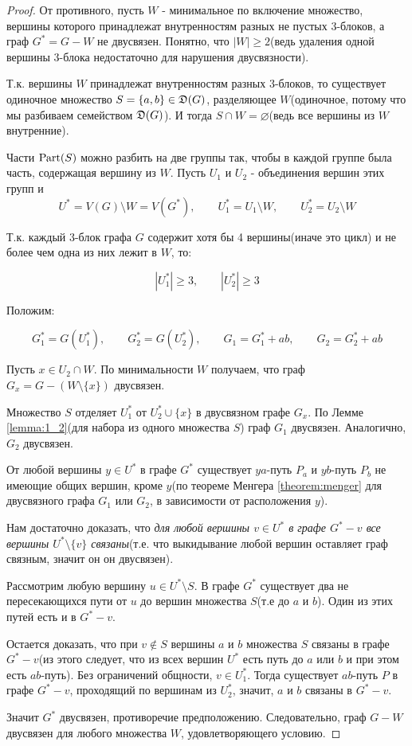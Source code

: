 \begin{proof}
	От противного, пусть $W$ - минимальное по включение множество, вершины которого принадлежат внутренностям разных не пустых 3-блоков, а граф  $G^* = G - W$ не двусвязен.
	Понятно, что  $|W| \geqslant 2$(ведь удаления одной вершины 3-блока недостаточно для нарушения двусвязности).

	Т.к. вершины  $W$ принадлежат внутренностям разных  $3$-блоков, то существует одиночное множество  $S = \{a, b\} \in \mathfrak{D}(G)$, разделяющее  $W$(одиночное, потому что мы разбиваем семейством $\mathfrak{D}(G)$).
	И тогда $S \cap W = \varnothing$(ведь все вершины из $W$ внутренние).
 
	Части $\operatorname{Part}(S)$ можно разбить на две группы так, чтобы в каждой группе была часть, содержащая вершину из  $W$.
	Пусть  $U_1$ и  $U_2$ - объединения вершин этих групп и 
	\[
		U^* = V(G) \setminus W = V(G^*), \qquad U_1^* = U_1 \setminus W, \qquad U^*_2 = U_2 \setminus W
	\]

	Т.к. каждый 3-блок графа $G$ содержит хотя бы 4 вершины(иначе это цикл) и не более чем одна из них лежит в  $W$, то:

	\[
		|U_1^*| \geqslant 3, \qquad |U_2^*| \geqslant 3
	\] 

	Положим:

	\[
		G_1^* = G(U_1^*), \qquad G_2^* = G(U_2^*), \qquad G_1 = G_1^* + ab, \qquad G_2 = G_2^* + ab
	\] 

	Пусть $x \in U_2 \cap W$.
	По минимальности $W$ получаем, что граф  $G_x = G - (W \setminus \{x\})$ двусвязен.

	Множество $S$ отделяет  $U_1^*$ от  $U_2^* \cup \{x \}$ в двусвязном графе $G_x$.
	По Лемме \ref{lemma:1_2}(для набора из одного множества $S$) граф $G_1$ двусвязен.
	Аналогично,  $G_2$ двусвязен.

	От любой вершины  $y \in U^*$ в графе  $G^*$ существует  $ya$-путь  $P_a$ и  $yb$-путь  $P_b$ не имеющие общих вершин, кроме  $y$(по теореме Менгера \ref{theorem:menger} для двусвязного графа  $G_1$ или $G_2$, в зависимости от расположения $y$). 

	Нам достаточно доказать, что \textit{для любой вершины $v \in U^*$ в графе  $G^* - v$ все вершины  $U^* \setminus \{v\}$ связаны}(т.е. что выкидывание любой вершин оставляет граф связным, значит он он двусвязен).

	Рассмотрим любую вершину $u \in U^* \setminus S$.
	В графе  $G^*$ существует два не пересекающихся пути от  $u$ до вершин множества  $S$(т.е до $a$ и  $b$).
	Один из этих путей есть и в  $G^* - v$.

	Остается доказать, что при  $v \not \in S$ вершины  $a$ и  $b$ множества  $S$ связаны в графе  $G^* - v$(из этого следует, что из всех вершин $U^*$ есть путь до $a$ или $b$ и при этом есть  $ab$-путь).
	Без ограничений общности, $v \in U_1^*$.
	Тогда существует $ab$-путь $P$ в графе $G^* - v$, проходящий по вершинам из $U_2^*$, значит, $a$ и $b$ связаны в  $G^* - v$.

	Значит $G^*$ двусвязен, противоречие предположению.
	Следовательно, граф $G - W$ двусвязен для любого множества $W$, удовлетворяющего условию.
\end{proof}

